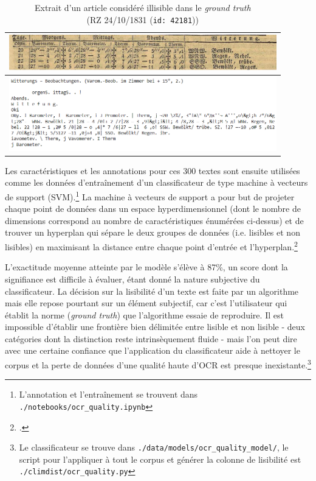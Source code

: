 \documentclass[a4paper,twoside,12pt]{article}
\begin{document}
\begin{table}[h]
\centering
\begin{tabular}{|p{0.9\linewidth}|}
\hline
\vspace{0.5ex}
\includegraphics[width={\linewidth}]{images/ocr_quality_example.png} \\
\hline
\includegraphics[width={\linewidth}]{images/ocr_quality_example_text.png} \\
\hline
\end{tabular}
\captionsetup{justification=centering}
\caption{Extrait d'un article considéré illisible dans le \textit{ground truth}\\ (RZ 24/10/1831 (\texttt{id: 42181}))}
\label{tab:readability_example}
\end{table}

Les caractéristiques et les annotations pour ces 300 textes sont ensuite utilisées comme les données d'entraînement d'un classificateur de type machine à vecteurs de support (SVM).\footnote{L'annotation et l'entraînement se trouvent dans \texttt{./notebooks/ocr\_quality.ipynb}} La machine à vecteurs de support a pour but de projeter chaque point de données dans un espace hyperdimensionnel (dont le nombre de dimensions correspond au nombre de caractéristiques énumérées ci-dessus) et de trouver un hyperplan qui sépare le deux groupes de données (i.e. lisibles et non lisibles) en maximisant la distance entre chaque point d'entrée et l'hyperplan.\footcite{suthaharan_support_2016}

L'exactitude moyenne atteinte par le modèle s'élève à 87\%, un score dont la signifiance est difficile à évaluer, étant donné la nature subjective du classificateur. La décision sur la lisibilité d'un texte est faite par un algorithme mais elle repose pourtant sur un élément subjectif, car c'est l'utilisateur qui établit la norme (\textit{ground truth}) que l'algorithme essaie de reproduire.
Il est impossible d'établir une frontière bien délimitée entre lisible et non lisible - deux catégories dont la distinction reste intrinsèquement fluide - mais l'on peut dire avec une certaine confiance que l'application du classificateur aide à nettoyer le corpus et la perte de données d'une qualité haute d'OCR est presque inexistante.\footnote{Le classificateur se trouve dans \texttt{./data/models/ocr\_quality\_model/}, le script pour l'appliquer à tout le corpus et générer la colonne de lisibilité est \texttt{./climdist/ocr\_quality.py}}
\end{document}
